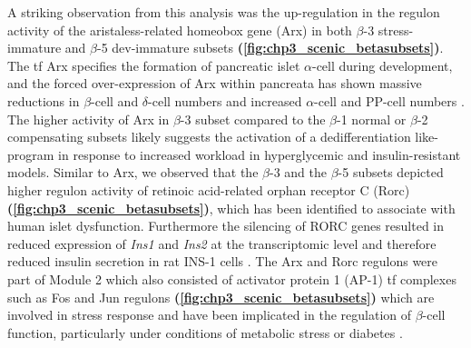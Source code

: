 \par A striking observation from this analysis was the up-regulation in the regulon activity of the aristaless-related homeobox gene (Arx) in both $\beta$-3 stress-immature and $\beta$-5 dev-immature subsets \textbf{(\autoref{fig:chp3_scenic_betasubsets})}. The \gls{tf} Arx specifies the formation of pancreatic islet $\alpha$-cell during development, and the forced over-expression of Arx within pancreata has shown massive reductions in $\beta$-cell and $\delta$-cell numbers and increased $\alpha$-cell and PP-cell numbers \textbf{\cite{van_der_meulen_role_2015}}. The higher activity of Arx in $\beta$-3 subset compared to the $\beta$-1 normal or $\beta$-2 compensating subsets likely suggests the activation of a dedifferentiation like-program in response to increased workload in hyperglycemic and insulin-resistant models. Similar to Arx, we observed that the $\beta$-3 and the $\beta$-5 subsets depicted higher regulon activity of retinoic acid-related orphan receptor C (Rorc) \textbf{(\autoref{fig:chp3_scenic_betasubsets})}, which has been identified to associate with human islet dysfunction. Furthermore the silencing of RORC genes resulted in reduced expression of \textit{Ins1} and \textit{Ins2} at the transcriptomic level and therefore reduced insulin secretion in rat INS-1 cells \textbf{\cite{taneera_rorb_2019}}. The Arx and Rorc regulons were part of Module 2 which also consisted of activator protein 1 (AP-1) \gls{tf} complexes such as Fos and Jun regulons \textbf{(\autoref{fig:chp3_scenic_betasubsets})} which are involved in stress response and have been implicated in the regulation of $\beta$-cell function, particularly under conditions of metabolic stress or diabetes \textbf{\cite{bahrami_gene_2016,backes_regulation_2021}}.\\



